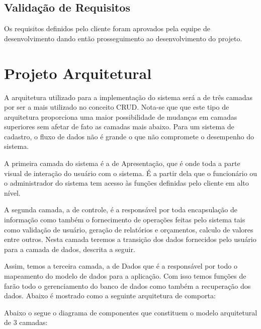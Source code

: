 \documentclass[a4paper,10pt]{article}
\begin{document}

\subsection{Validação de Requisitos}

Os requisitos definidos pelo cliente foram aprovados pela equipe de desenvolvimento dando então prosseguimento ao desenvolvimento do projeto.

\section{Projeto Arquitetural}

A arquitetura utilizado para a implementação do sistema será a de três camadas por ser a mais utilizado no conceito CRUD. Nota-se que que este tipo de arquitetura proporciona uma maior possibilidade de mudanças em camadas superiores sem afetar de fato as camadas mais abaixo. Para um sistema de cadastro, o fluxo de dados não é grande o que não compromete o desempenho do sistema.

A primeira camada do sistema é a de Apresentação, que é onde toda a parte visual de interação do usuário com o sistema. É a partir dela que o funcionário ou o administrador do sistema tem acesso às funções definidas pelo cliente em alto nível.

A segunda camada, a de controle, é a responsável por toda encapsulação de informação como também o fornecimento de operações feitas pelo sistema tais como validação de usuário, geração de relatórios e orçamentos, calculo de valores entre outros. Nesta camada teremos a transição dos dados fornecidos pelo usuário para a camada de dados, descrita a seguir.

Assim, temos a terceira camada, a de Dados que é a responsável por todo o mapeamento do modelo de dados para a aplicação. Com isso temos funções de farão todo o gerenciamento do banco de dados como também a recuperação dos dados. Abaixo é mostrado como a seguinte arquitetura de comporta:


Abaixo o segue o diagrama de componentes que constituem o modelo arquitetural de 3 camadas:
\end{document}
